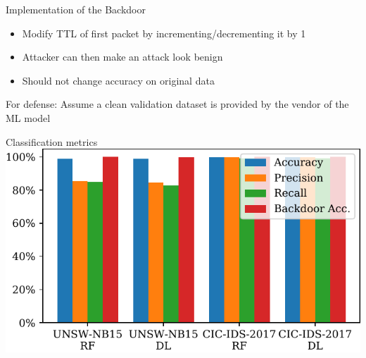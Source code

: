 \documentclass[xcolor={dvipsnames}]{beamer}
\begin{document}
\begin{frame}{Implementation of the Backdoor}
\begin{itemize}
\item Modify TTL of first packet by incrementing/decrementing it by 1
\item Attacker can then make an attack look benign
\item Should not change accuracy on original data
\end{itemize}
\pause
\begin{block}{For defense:}
Assume a clean validation dataset is provided by the vendor of the ML model
\end{block}
\end{frame}

\begin{frame}{Classification metrics}
\centering
\includegraphics[width=1.05\columnwidth]{figures/bar_plot_metrics}
\end{frame}
\end{document}
